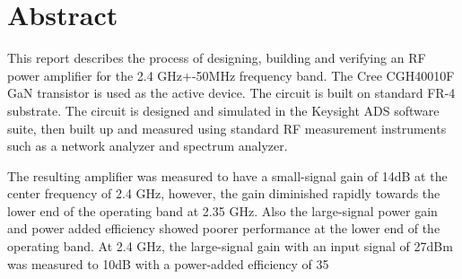 \chapter{Abstract}
This report describes the process of designing, building and verifying an RF power amplifier for the 2.4 GHz+-50MHz frequency band. The Cree CGH40010F GaN transistor is used as the active device. The circuit is built on standard FR-4 substrate. The circuit is designed and simulated in the Keysight ADS software suite, then built up and measured using standard RF measurement instruments such as a network analyzer and spectrum analyzer.

The resulting amplifier was measured to have a small-signal gain of 14dB at the center frequency of 2.4 GHz, however, the gain diminished rapidly towards the lower end of the operating band at 2.35 GHz. Also the large-signal power gain and power added efficiency showed poorer performance at the lower end of the operating band. At 2.4 GHz, the large-signal gain with an input signal of 27dBm was measured to 10dB with a power-added efficiency of 35%

